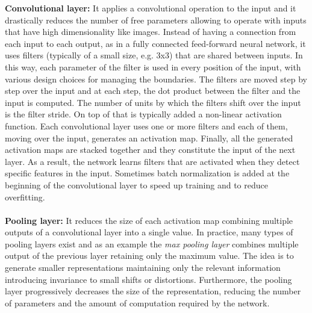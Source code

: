 \begin{figure}[t]
    \centering
    
%    
    \label{fig:network_architecture_example}
\end{figure}
\noindent
\textbf{Convolutional layer:} It applies a convolutional operation to the input and it drastically reduces the number of free parameters allowing to operate with inputs that have high dimensionality like images. Instead of having a connection from each input to each output, as in a fully connected feed-forward neural network, it uses filters (typically of a small size, e.g. 3x3) that are shared between inputs. In this way, each parameter of the filter is used in every position of the input, with various design choices for managing the boundaries. The filters are moved step by step over the input and at each step, the dot product between the filter and the input is computed. The number of units by which the filters shift over the input is the filter stride. On top of that is typically added a non-linear activation function. Each convolutional layer uses one or more filters and each of them, moving over the input, generates an activation map. Finally, all the generated activation maps are stacked together and they constitute the input of the next layer. As a result, the network learns filters that are activated when they detect specific features in the input. Sometimes batch normalization is added at the beginning of the convolutional layer to speed up training and to reduce overfitting. \\ \\
\textbf{Pooling layer:} It reduces the size of each activation map combining multiple outputs of a convolutional layer into a single value. In practice, many types of pooling layers exist and as an example the \textit{max pooling layer} combines multiple output of the previous layer retaining only the maximum value. The idea is to generate smaller representations maintaining only the relevant information introducing invariance to small shifts or distortions. Furthermore, the pooling layer progressively decreases the size of the representation, reducing the number of parameters and the amount of computation required by the network.\\ \\
